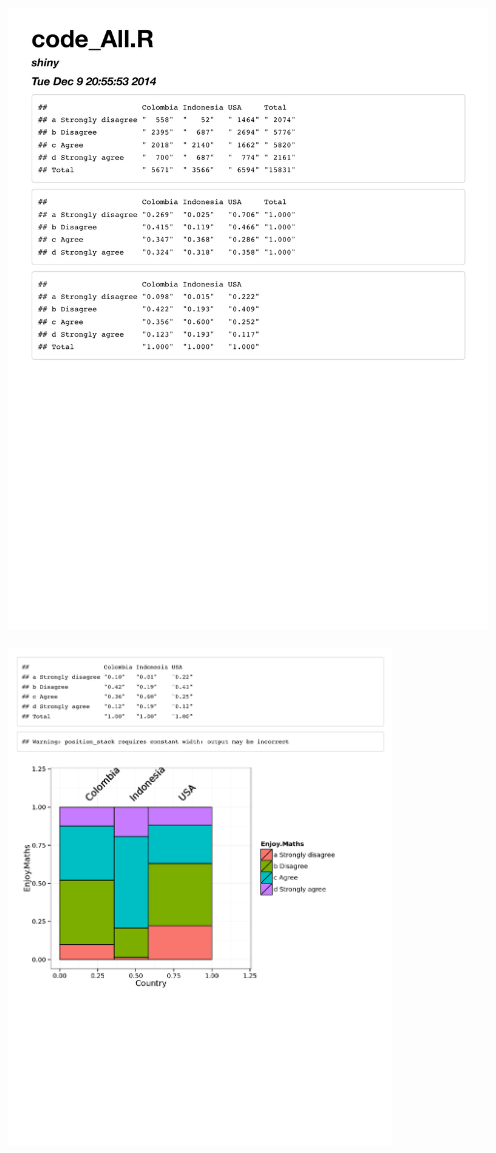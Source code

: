 \documentclass{article}
\begin{document}
\begin{enumerate}
\centerline{\includegraphics[width=5in]{contingency.pdf}}

\centerline{\includegraphics[width=4in]{mosaic.pdf}}


\end{enumerate}
\end{document}
